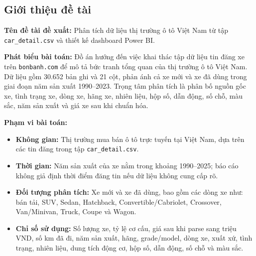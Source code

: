\subsection{Giới thiệu đề tài}

\textbf{Tên đề tài đề xuất:} Phân tích dữ liệu thị trường ô tô Việt Nam từ tập \texttt{car\_detail.csv} và thiết kế dashboard Power BI.

\textbf{Phát biểu bài toán:} Đồ án hướng đến việc khai thác tập dữ liệu tin đăng xe trên \texttt{bonbanh.com} để mô tả bức tranh tổng quan của thị trường ô tô Việt Nam. Dữ liệu gồm 30.652 bản ghi và 21 cột, phản ánh cả xe mới và xe đã dùng trong giai đoạn năm sản xuất 1990--2023. Trọng tâm phân tích là phân bố nguồn gốc xe, tình trạng xe, dòng xe, hãng xe, nhiên liệu, hộp số, dẫn động, số chỗ, màu sắc, năm sản xuất và giá xe sau khi chuẩn hóa.

\textbf{Phạm vi bài toán:}
\begin{itemize}[leftmargin=1.5cm]
    \item \textbf{Không gian:} Thị trường mua bán ô tô trực tuyến tại Việt Nam, dựa trên các tin đăng trong tập \texttt{car\_detail.csv}.
    \item \textbf{Thời gian:} Năm sản xuất của xe nằm trong khoảng 1990--2025; báo cáo không giả định thời điểm đăng tin nếu dữ liệu không cung cấp rõ.
    \item \textbf{Đối tượng phân tích:} Xe mới và xe đã dùng, bao gồm các dòng xe như: bán tải, SUV, Sedan, Hatchback, Convertible/Cabriolet, Crossover, Van/Minivan, Truck, Coupe và Wagon.
    \item \textbf{Chỉ số sử dụng:} Số lượng xe, tỷ lệ cơ cấu, giá sau khi parse sang triệu VND, số km đã đi, năm sản xuất, hãng, grade/model, dòng xe, xuất xứ, tình trạng, nhiên liệu, dung tích động cơ, hộp số, dẫn động, số chỗ và màu sắc.
\end{itemize}

